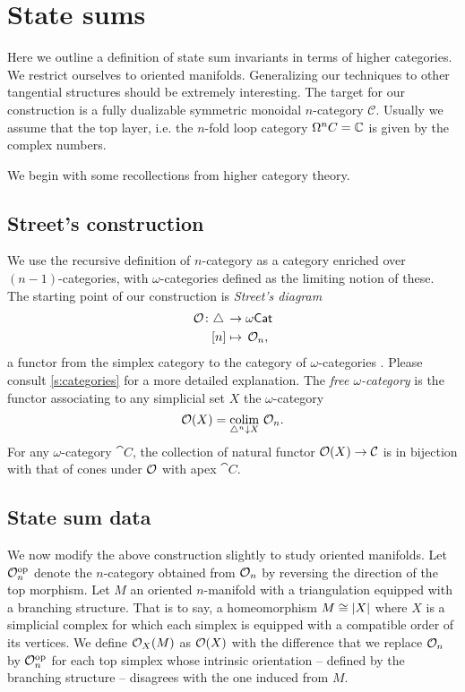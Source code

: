 
\section{State sums}

Here we outline a definition of state sum invariants in terms of higher categories.
We restrict ourselves to oriented manifolds.
Generalizing our techniques to other tangential structures should be extremely interesting.
The target for our construction is a fully dualizable symmetric monoidal $n$-category $\mathcal{C}$.
Usually we assume that the top layer, i.e.
the $n$-fold loop category $\Omega^nC = \mathbb{C} $ is given by the complex numbers.

We begin with some recollections from higher category theory.

\subsection{Street's construction}

We use the recursive definition of $n$-category as a category enriched over $(n-1)$-categories, with $\omega$-categories defined as the limiting notion of these.
The starting point of our construction is \textit{Street's diagram}
\[
\begin{split}
	\mathcal{O} \colon \triangle \, &\to \omega\mathsf{Cat} \\
	[n] &\mapsto \, \mathcal{O}_n,
\end{split}
\]
a functor from the simplex category to the category of $\omega$-categories \cite{street1987orientals}.
Please consult \cref{s:categories} for a more detailed explanation.
The \textit{free $\omega$-category} is the functor associating to any simplicial set $X$ the $\omega$-category
\[
\mathcal{O}(X) = \operatorname*{colim}_{\triangle^n \downarrow X} \, \mathcal{O}_n.
\]
For any $\omega$-category $\cat{C}$, the collection of natural functor $\mathcal{O}(X) \to \mathcal{C}$ is in bijection with that of cones under $\mathcal{O}$ with apex $\cat{C}$.

\subsection{State sum data}

We now modify the above construction slightly to study oriented manifolds.
Let $\mathcal{O}_n^{\mathrm{op}}$ denote the $n$-category obtained from $\mathcal{O}_n$ by reversing the direction of the top morphism.
Let $M$ an oriented $n$-manifold with a triangulation equipped with a branching structure.
That is to say, a homeomorphism $M \cong \lvert X\rvert$ where $X$ is a simplicial complex for which each simplex is equipped with a compatible order of its vertices.
We define $\mathcal{O}_X(M)$ as $\mathcal{O}(X)$ with the difference that we replace $\mathcal{O}_n$ by $\mathcal{O}_n^{\mathrm{op}}$ for each top simplex whose intrinsic orientation -- defined by the branching structure -- disagrees with the one induced from $M$.

